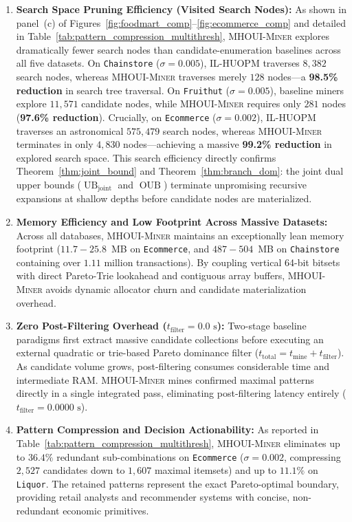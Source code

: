 \documentclass[runningheads]{llncs}
\newcommand{\MHOUIminer}{\textsc{MHOUI-Miner}}
\newcommand{\OUB}{\operatorname{OUB}}
\newcommand{\UBjoint}{\operatorname{UB}_{\mathrm{joint}}}
\begin{document}
\begin{enumerate}
    \item \textbf{Search Space Pruning Efficiency (Visited Search Nodes):}
    As shown in panel~(c) of Figures~\ref{fig:foodmart_comp}--\ref{fig:ecommerce_comp} and detailed in Table~\ref{tab:pattern_compression_multithresh}, \MHOUIminer{} explores dramatically fewer search nodes than candidate-enumeration baselines across all five datasets.
    On \texttt{Chainstore} ($\sigma=0.005$), \textsc{IL-HUOPM} traverses $8{,}382$ search nodes, whereas \MHOUIminer{} traverses merely $128$ nodes---a \textbf{98.5\% reduction} in search tree traversal.
    On \texttt{Fruithut} ($\sigma=0.005$), baseline miners explore $11{,}571$ candidate nodes, while \MHOUIminer{} requires only $281$ nodes (\textbf{97.6\% reduction}).
    Crucially, on \texttt{Ecommerce} ($\sigma=0.002$), \textsc{IL-HUOPM} traverses an astronomical $575{,}479$ search nodes, whereas \MHOUIminer{} terminates in only $4{,}830$ nodes---achieving a massive \textbf{99.2\% reduction} in explored search space.
    This search efficiency directly confirms Theorem~\ref{thm:joint_bound} and Theorem~\ref{thm:branch_dom}: the joint dual upper bounds ($\UBjoint$ and $\OUB$) terminate unpromising recursive expansions at shallow depths before candidate nodes are materialized.

    \item \textbf{Memory Efficiency and Low Footprint Across Massive Datasets:}
    Across all databases, \MHOUIminer{} maintains an exceptionally lean memory footprint ($11.7 - 25.8$~MB on \texttt{Ecommerce}, and $487 - 504$~MB on \texttt{Chainstore} containing over $1.11$ million transactions).
    By coupling vertical 64-bit bitsets with direct Pareto-Trie lookahead and contiguous array buffers, \MHOUIminer{} avoids dynamic allocator churn and candidate materialization overhead.

    \item \textbf{Zero Post-Filtering Overhead ($t_{\text{filter}} = 0.0\text{ s}$):}
    Two-stage baseline paradigms first extract massive candidate collections before executing an external quadratic or trie-based Pareto dominance filter ($t_{\text{total}} = t_{\text{mine}} + t_{\text{filter}}$).
    As candidate volume grows, post-filtering consumes considerable time and intermediate RAM.
    \MHOUIminer{} mines confirmed maximal patterns directly in a single integrated pass, eliminating post-filtering latency entirely ($t_{\text{filter}} = 0.0000\text{ s}$).

    \item \textbf{Pattern Compression and Decision Actionability:}
    As reported in Table~\ref{tab:pattern_compression_multithresh}, \MHOUIminer{} eliminates up to $36.4\%$ redundant sub-combinations on \texttt{Ecommerce} ($\sigma=0.002$, compressing $2{,}527$ candidates down to $1{,}607$ maximal itemsets) and up to $11.1\%$ on \texttt{Liquor}.
    The retained patterns represent the exact Pareto-optimal boundary, providing retail analysts and recommender systems with concise, non-redundant economic primitives.
\end{enumerate}
\end{document}
